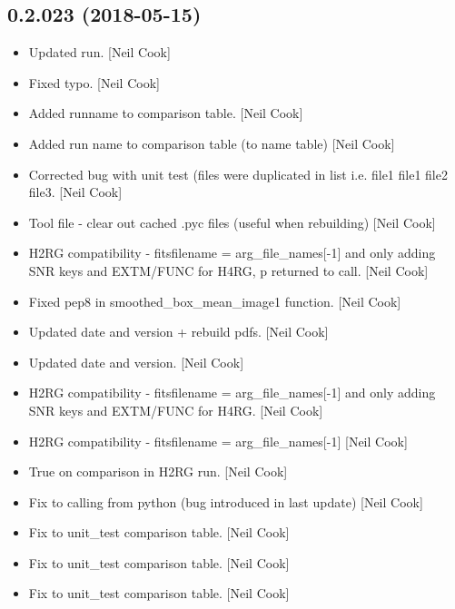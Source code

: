 \documentclass[a4paper,10pt,english]{report}
\begin{document}
\subsection{0.2.023 (2018-05-15)}
\label{\detokenize{misc/changelog:id436}}\begin{itemize}
\item {} 
Updated run. {[}Neil Cook{]}

\item {} 
Fixed typo. {[}Neil Cook{]}

\item {} 
Added runname to comparison table. {[}Neil Cook{]}

\item {} 
Added run name to comparison table (to name table) {[}Neil Cook{]}

\item {} 
Corrected bug with unit test (files were duplicated in list i.e. file1
file1 file2 file3. {[}Neil Cook{]}

\item {} 
Tool file - clear out cached .pyc files (useful when rebuilding) {[}Neil
Cook{]}

\item {} 
H2RG compatibility - fitsfilename = arg\_file\_names{[}-1{]} and only adding
SNR keys and EXTM/FUNC for H4RG, p returned to call. {[}Neil Cook{]}

\item {} 
Fixed pep8 in smoothed\_box\_mean\_image1 function. {[}Neil Cook{]}

\item {} 
Updated date and version + rebuild pdfs. {[}Neil Cook{]}

\item {} 
Updated date and version. {[}Neil Cook{]}

\item {} 
H2RG compatibility - fitsfilename = arg\_file\_names{[}-1{]} and only adding
SNR keys and EXTM/FUNC for H4RG. {[}Neil Cook{]}

\item {} 
H2RG compatibility - fitsfilename = arg\_file\_names{[}-1{]} {[}Neil Cook{]}

\item {} 
True on comparison in H2RG run. {[}Neil Cook{]}

\item {} 
Fix to calling from python (bug introduced in last update) {[}Neil Cook{]}

\item {} 
Fix to unit\_test comparison table. {[}Neil Cook{]}

\item {} 
Fix to unit\_test comparison table. {[}Neil Cook{]}

\item {} 
Fix to unit\_test comparison table. {[}Neil Cook{]}

\end{itemize}
\end{document}
